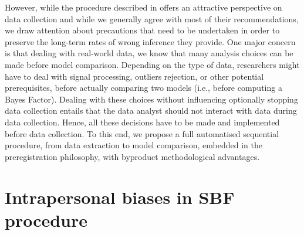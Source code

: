 \documentclass[a4paper,man,natbib,floatsintext,donotrepeattitle]{apa6}
\begin{document}
However, while the procedure described in \cite{schonbrodt_sequential_2017} offers an attractive perspective on data collection and while we generally agree with most of their recommendations, we draw attention about precautions that need to be undertaken in order to preserve the long-term rates of wrong inference they provide. One major concern is that dealing with real-world data, we know that many analysis choices can be made before model comparison. Depending on the type of data, researchers might have to deal with signal processing, outliers rejection, or other potential prerequisites, before actually comparing two models (i.e., before computing a Bayes Factor). Dealing with these choices without influencing optionally stopping data collection entails that the data analyst should not interact with data during data collection. Hence, all these decisions have to be made and implemented before data collection. To this end, we propose a full automatised sequential procedure, from data extraction to model comparison, embedded in the preregistration philosophy, with byproduct methodological advantages.


\section{Intrapersonal biases in SBF procedure}
\end{document}
